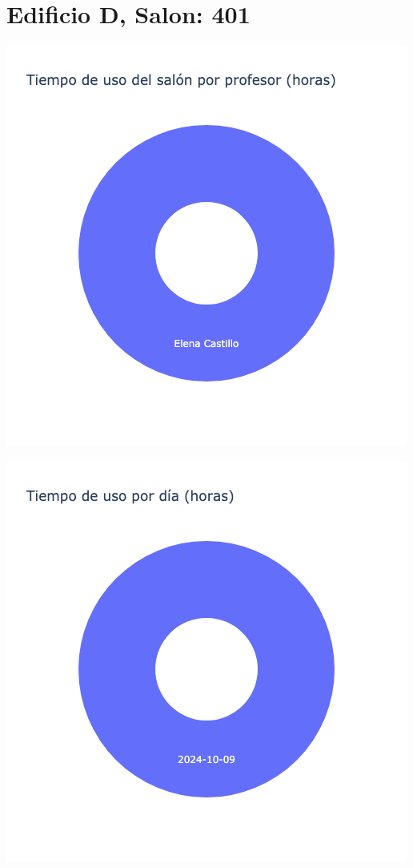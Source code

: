 \documentclass{article}
\begin{document}
    \section{Edificio D, Salon: 401}
    \noindent
    \begin{minipage}{0.48\textwidth}
        \centering
        \includegraphics[width=\textwidth]{../img/pie/UP401-90Dias-03-12-2024.png}
    \end{minipage}
    \hfill
    \begin{minipage}{0.48\textwidth}
        \centering
        \includegraphics[width=\textwidth]{../img/pie/UD401-90Dias-03-12-2024.png}
    \end{minipage}
    
\end{document}
